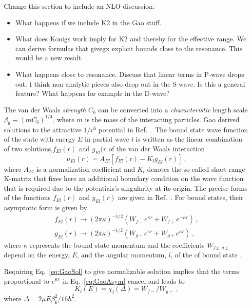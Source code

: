\documentclass[aps,preprint,superscriptaddress]{revtex4-1}
\begin{document}
Change this section to include an NLO discussion:
\begin{itemize}
\item  What happens if we include K2 in the Gao stuff.
\item What does Konigs work imply for K2 and thereby for the effective
  range. We can derive formulas that givegx explicit bounds close to the
  resonance. This would be a new result.
\item What happens close to resonance. Discuss that linear terms in
  P-wave drops out. I think non-analytic pieces also drop out in the
  S-wave. Is this a general feature? What happens for example in the
  D-wave? 
\end{itemize}


The van der Waals {\it strength} $C_6$ can be converted into a {\it
  characteristic} length scale $\beta_6\equiv {(mC_6)}^{1/4}$, where
$m$ is the mass of the interacting particles. Gao derived solutions
to the attractive $1/r^6$ potential in
Ref.~\cite{PhysRevA.58.1728}. The bound state wave function of the
state with energy $E$ in partial wave $l$ is written as the linear
combination of two solutions,$f_{E l}(r) $ and $g_{E l}(r$ of the
van der Waals interaction
\begin{equation}
  \label{eq:GaoSol}
  u_{E l}(r) = A_{E l}\left[f_{E l}(r) - K_l g_{E l}(r)\right]~,
\end{equation}
where $A_{E l}$ is a normalization coefficient and $K_l$ denotes the
so-called short-range K-matrix that fixes here an additional boundary
condition on the wave function that is required due to the
potentials's singularity at its origin. The precise forms of the
functions $f_{E l}(r)$ and $g_{E l}(r)$ are given in
Ref.~\cite{PhysRevA.58.1728}. For bound states, their asymptotic
form is given by
\begin{align}
  \label{eq:GaoAsym}
  f_{El}(r) \rightarrow {(2\pi \kappa)}^{-1/2} (W_{f-}e^{\kappa r} +
  W_{f+}e^{-\kappa r})~, \nonumber \\
  g_{El}(r) \rightarrow {(2\pi \kappa)}^{-1/2} (W_{g-}e^{\kappa r} +
  W_{g+}e^{\kappa r})~,
\end{align}
where $\kappa$ represents the bound state momentum and the
coefficients $W_{f\pm,g\pm}$ depend on the energy, $E$,
and the angular momentum, $l$, of the of bound state \cite{PhysRevA.58.1728}.

Requiring Eq.~\eqref{eq:GaoSol} to give normalizable solution implies
that the terms proportional to $e^{\kappa r}$ in
Eq.~\eqref{eq:GaoAsym} cancel and leads to
\begin{equation}
  \label{eq:chi}
  K_l(E) = \chi_l(\Delta) = W_{f-}/W_{g-}~,
\end{equation}
where $\Delta = 2\mu E \beta_6^2/16\hbar^2$.
\end{document}
